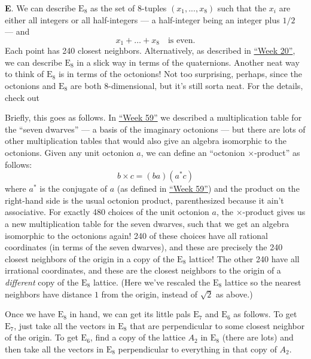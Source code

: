 \documentclass{article}
\def\tightlist{}
\renewcommand{\texttt}[1]{%
  \begingroup
  \ttfamily
  \begingroup\lccode`~=`/\lowercase{\endgroup\def~}{/\discretionary{}{}{}}%
  \begingroup\lccode`~=`[\lowercase{\endgroup\def~}{[\discretionary{}{}{}}%
  \begingroup\lccode`~=`.\lowercase{\endgroup\def~}{.\discretionary{}{}{}}%
  \catcode`/=\active\catcode`[=\active\catcode`.=\active
  \scantokens{#1\noexpand}%
  \endgroup
}
\begin{document}
\textbf{E}. We can describe \(\mathrm{E}_8\) as the set of 8-tuples
\((x_1,...,x_8)\) such that the \(x_i\) are either all integers or all
half-integers --- a half-integer being an integer plus \(1/2\) --- and
\[x_1+\ldots+x_8\quad\text{is even}.\] Each point has 240 closest
neighbors. Alternatively, as described in
\protect\hyperlink{week20}{``Week 20''}, we can describe
\(\mathrm{E}_8\) in a slick way in terms of the quaternions. Another
neat way to think of \(\mathrm{E}_8\) is in terms of the octonions! Not
too surprising, perhaps, since the octonions and \(\mathrm{E}_8\) are
both \(8\)-dimensional, but it's still sorta neat. For the details,
check out


Briefly, this goes as follows. In \protect\hyperlink{week59}{``Week
59''} we described a multiplication table for the ``seven dwarves'' ---
a basis of the imaginary octonions --- but there are lots of other
multiplication tables that would also give an algebra isomorphic to the
octonions. Given any unit octonion \(a\), we can define an ``octonion
\(\times\)-product'' as follows: \[b \times c = (b a)(a^* c)\] where
\(a^*\) is the conjugate of \(a\) (as defined in
\protect\hyperlink{week59}{``Week 59''}) and the product on the
right-hand side is the usual octonion product, parenthesized because it
ain't associative. For exactly 480 choices of the unit octonion \(a\),
the \(\times\)-product gives us a new multiplication table for the seven
dwarves, such that we get an algebra isomorphic to the octonions again!
240 of these choices have all rational coordinates (in terms of the
seven dwarves), and these are precisely the 240 closest neighbors of the
origin in a copy of the \(\mathrm{E}_8\) lattice! The other 240 have all
irrational coordinates, and these are the closest neighbors to the
origin of a \emph{different} copy of the \(\mathrm{E}_8\) lattice. (Here
we've rescaled the \(\mathrm{E}_8\) lattice so the nearest neighbors
have distance \(1\) from the origin, instead of \(\sqrt{2}\) as above.)

Once we have \(\mathrm{E}_8\) in hand, we can get its little pals
\(\mathrm{E}_7\) and \(\mathrm{E}_6\) as follows. To get
\(\mathrm{E}_7\), just take all the vectors in \(\mathrm{E}_8\) that are
perpendicular to some closest neighbor of the origin. To get
\(\mathrm{E}_6\), find a copy of the lattice \(A_2\) in \(\mathrm{E}_8\)
(there are lots) and then take all the vectors in \(\mathrm{E}_8\)
perpendicular to everything in that copy of \(A_2\).
\end{document}
